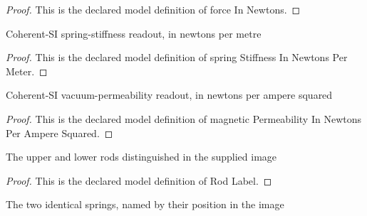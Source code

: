 \begin{proof}
  This is the declared model definition of force In Newtons.
\end{proof}
\begin{definition}
  \label{def:physics:phyx-mini-0968:phyxminiproblems-problemphyxmini0968-springstiffnessinnewtonspermeter}
  Coherent-SI spring-stiffness readout, in newtons per metre
\end{definition}
\begin{proof}
  This is the declared model definition of spring Stiffness In Newtons Per Meter.
\end{proof}
\begin{definition}
  \label{def:physics:phyx-mini-0968:phyxminiproblems-problemphyxmini0968-magneticpermeabilityinnewtonsperamperesquared}
  Coherent-SI vacuum-permeability readout, in newtons per ampere squared
\end{definition}
\begin{proof}
  This is the declared model definition of magnetic Permeability In Newtons Per Ampere Squared.
\end{proof}
\begin{definition}
  \label{def:physics:phyx-mini-0968:phyxminiproblems-problemphyxmini0968-rodlabel}
  The upper and lower rods distinguished in the supplied image
\end{definition}
\begin{proof}
  This is the declared model definition of Rod Label.
\end{proof}
\begin{definition}
  \label{def:physics:phyx-mini-0968:phyxminiproblems-problemphyxmini0968-springlabel}
  The two identical springs, named by their position in the image
\end{definition}
